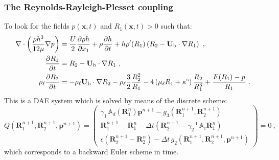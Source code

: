 \documentclass[10pt,aspectratio=169]{beamer}
\begin{document}
\begin{frame}
\frametitle{The Reynolds-Rayleigh-Plesset coupling}
\vspace*{0.5cm}
To look for the fields $p(\mathbf{x},t)$ and $R_1(\mathbf{x},t)>0$ such that:
\begin{align*}
\nabla\cdot \left(\frac{\rho h^3}{12\mu}\nabla p\right)&=\frac{U}{2}\frac{\partial \rho h}{\partial x_1}+\rho \frac{\partial h}{\partial t}+h \rho'(R_1)\left(R_2-\mathbf{U}_\textnormal{b}\cdot\nabla R_1\right)~,\\
\frac{\partial R_1}{\partial t}&=R_2-\mathbf{U}_\textnormal{b}\cdot \nabla R_1~,\\
\rho_\ell\frac{\partial R_2}{\partial t}&=-\rho_\ell\mathbf{U}_\textnormal{b}\cdot \nabla R_2-\rho_\ell\frac{3}{2}\frac{R_2^2}{R_1}-4\left(\mu_\ell R_1+\kappa^\textnormal{s}\right)\frac{R_2}{R_1^3}+\frac{F(R_1)-p}{R_1}~.
\end{align*}	
This is a DAE system which is solved by means of the discrete scheme:
 \begin{equation*}
Q\left( \mathbf{R}_1^{n+1},\mathbf{R}_2^{n+1},\mathbf{p}^{n+1}\right)
=\begin{pmatrix}
\gamma_1\,\mathbb{A}_d\left(\mathbf{R}_1^{n}\right)\mathbf{p}^{n+1}-g_3(\mathbf{R}_1^{n+1},\mathbf{R}_2^{n+1})\\
\mathbf{R}_1^{n+1}-\mathbf{R}_1^n-\Delta t\left(\mathbf{R}_2^{n+1}-\gamma_2^{-1}\,\mathbb{A}_c \mathbf{R}_1^{n}\right)\\
\epsilon \left(\mathbf{R}_2^{n+1}-\mathbf{R}_2^n\right)-\Delta t\, g_2(\mathbf{R}_1^{n+1},\mathbf{R}_2^{n+1},\mathbf{p}^{n+1})
\end{pmatrix}=0~,
\end{equation*}
which corresponds to a backward Euler scheme in time.
\end{frame} 
\end{document}
